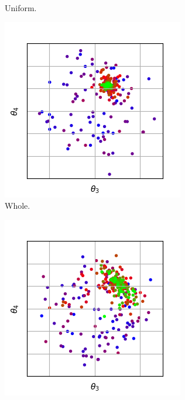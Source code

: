 \documentclass{llncs}
\begin{document}
\begin{figure}[t]
\begin{subfigure}[t]{0.24\textwidth}
        \caption{Uniform.}
        \label{subfig:recomb_uniform_23}
    \end{subfigure}
    \begin{subfigure}[t]{0.24\textwidth}
        \centering
        \captionsetup{width=.9\textwidth}
        \includegraphics[width=\textwidth]{figures/recombination/simple_normal-100-10_whole_2-3.png}
        \caption{Whole.}
        \label{subfig:recomb_whole_23}
    \end{subfigure}
    \begin{subfigure}[t]{0.24\textwidth}
        \centering
        \captionsetup{width=.9\textwidth}
        \includegraphics[width=\textwidth]{figures/recombination/simple_normal-100-10_blend-0.5_2-3.png}

\end{subfigure}
\end{figure}
\end{document}
